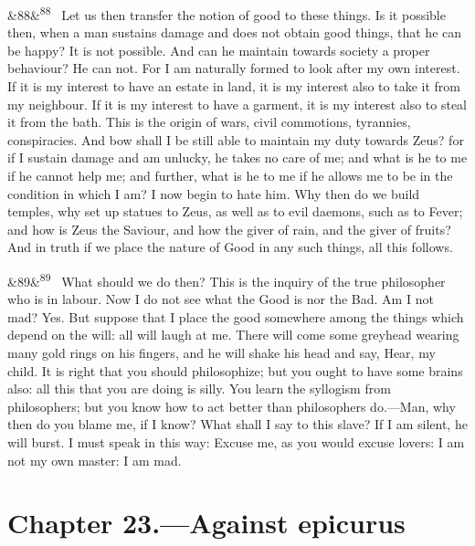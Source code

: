 \documentclass[12pt]{article}
\newcommand{\para}[1][]{\par\noindent\ifx&#1&\else\textsuperscript{\footnotesize #1}~\fi}
\begin{document}
\para[88] Let us then transfer the notion of good to these things. Is it possible then, when a man sustains damage and does not obtain good things, that he can be happy? It is not possible. And can he maintain towards society a proper behaviour? He can not. For I am naturally formed to look after my own interest. If it is my interest to have an estate in land, it is my interest also to take it from my neighbour. If it is my interest to have a garment, it is my interest also to steal it from the bath. This is the origin of wars, civil commotions, tyrannies, conspiracies. And bow shall I be still able to maintain my duty towards Zeus? for if I sustain damage and am unlucky, he takes no care of me; and what is he to me if he cannot help me; and further, what is he to me if he allows me to be in the condition in which I am? I now begin to hate him. Why then do we build temples, why set up statues to Zeus, as well as to evil daemons, such as to Fever; and how is Zeus the Saviour, and how the giver of rain, and the giver of fruits? And in truth if we place the nature of Good in any such things, all this follows.

\para[89] What should we do then? This is the inquiry of the true philosopher who is in labour. Now I do not see what the Good is nor the Bad. Am I not mad? Yes. But suppose that I place the good somewhere among the things which depend on the will: all will laugh at me. There will come some greyhead wearing many gold rings on his fingers, and he will shake his head and say, Hear, my child. It is right that you should philosophize; but you ought to have some brains also: all this that you are doing is silly. You learn the syllogism from philosophers; but you know how to act better than philosophers do.—Man, why then do you blame me, if I know? What shall I say to this slave? If I am silent, he will burst. I must speak in this way: Excuse me, as you would excuse lovers: I am not my own master: I am mad.

\section*{Chapter 23.---Against epicurus}
\end{document}
